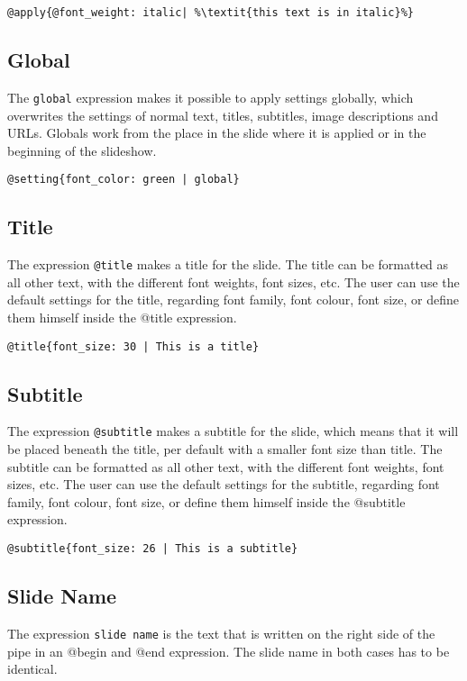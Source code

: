\begin{lstlisting}[frame=single]
	@apply{@font_weight: italic| %\textit{this text is in italic}%}
\end{lstlisting}

\subsection{Global}
The \texttt{global} expression makes it possible to apply settings globally, which overwrites the settings of normal text, titles, subtitles, image descriptions and URLs. Globals work from the place in the slide where it is applied or in the beginning of the slideshow. 
\begin{lstlisting}[frame=single]
	@setting{font_color: green | global}
\end{lstlisting}


\subsection{Title}
The expression \texttt{@title} makes a title for the slide. The title can be formatted as all other text, with the different font weights, font sizes, etc. The user can use the default settings for the title, regarding font family, font colour, font size, or define them himself inside the @title expression.
\begin{lstlisting}[frame=single]
	@title{font_size: 30 | This is a title}
\end{lstlisting}


\subsection{Subtitle}
The expression \texttt{@subtitle} makes a subtitle for the slide, which means that it will be placed beneath the title, per default with a smaller font size than title. The subtitle can be formatted as all other text, with the different font weights, font sizes, etc. The user can use the default settings for the subtitle, regarding font family, font colour, font size, or define them himself inside the @subtitle expression.

\begin{lstlisting}[frame=single]
	@subtitle{font_size: 26 | This is a subtitle}
\end{lstlisting}


\subsection{Slide Name}
The expression \texttt{slide name} is the text that is written on the right side of the pipe in an @begin{} and @end{} expression. The slide name in both cases has to be identical.

